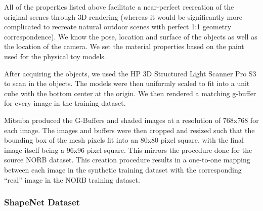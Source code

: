 \documentclass[10pt,twocolumn,letterpaper]{article}
\begin{document}
 All of the properties listed above facilitate a near-perfect recreation of the original scenes through 3D rendering (whereas it would be significantly more complicated to recreate natural outdoor scenes with perfect 1:1 geometry correspondence). We know the pose, location and surface of the objects as well as the location of the camera. We set the material properties based on the paint used for the physical toy models.
 
After acquiring the objects, we used the HP 3D Structured Light Scanner Pro S3\cite{HPSCANNER} to scan in the objects. The models were then uniformly scaled to fit into a unit cube with the bottom center at the origin. We then rendered a matching g-buffer for every image in the training dataset.  

Mitsuba produced the G-Buffers and shaded images at a resolution of 768x768 for each image.  The images and buffers were then cropped and resized such that the bounding box of the mesh pixels fit into an 80x80 pixel square, with the final image itself being a 96x96 pixel square. This mirrors the procedure done for the source NORB dataset. This creation procedure results in a one-to-one mapping between each image in the synthetic training dataset with the corresponding ``real'' image in the NORB training dataset.
\subsubsection{ShapeNet Dataset}
\end{document}
